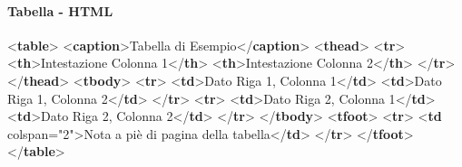 \documentclass[
]{article}
\newenvironment{Shaded}{}{}
\newcommand{\DataTypeTok}[1]{\textcolor[rgb]{0.56,0.13,0.00}{#1}}
\newcommand{\KeywordTok}[1]{\textcolor[rgb]{0.00,0.44,0.13}{\textbf{#1}}}
\newcommand{\NormalTok}[1]{#1}
\newcommand{\OperatorTok}[1]{\textcolor[rgb]{0.40,0.40,0.40}{#1}}
\newcommand{\OtherTok}[1]{\textcolor[rgb]{0.00,0.44,0.13}{#1}}
\newcommand{\StringTok}[1]{\textcolor[rgb]{0.25,0.44,0.63}{#1}}
\begin{document}


\paragraph{Tabella - HTML}\label{tabella---html}

\begin{Shaded}
\begin{Highlighting}[]
\DataTypeTok{\textless{}}\KeywordTok{table}\DataTypeTok{\textgreater{}}
  \DataTypeTok{\textless{}}\KeywordTok{caption}\DataTypeTok{\textgreater{}}\NormalTok{Tabella di Esempio}\DataTypeTok{\textless{}/}\KeywordTok{caption}\DataTypeTok{\textgreater{}}
  \DataTypeTok{\textless{}}\KeywordTok{thead}\DataTypeTok{\textgreater{}}
    \DataTypeTok{\textless{}}\KeywordTok{tr}\DataTypeTok{\textgreater{}}
      \DataTypeTok{\textless{}}\KeywordTok{th}\DataTypeTok{\textgreater{}}\NormalTok{Intestazione Colonna 1}\DataTypeTok{\textless{}/}\KeywordTok{th}\DataTypeTok{\textgreater{}}
      \DataTypeTok{\textless{}}\KeywordTok{th}\DataTypeTok{\textgreater{}}\NormalTok{Intestazione Colonna 2}\DataTypeTok{\textless{}/}\KeywordTok{th}\DataTypeTok{\textgreater{}}
    \DataTypeTok{\textless{}/}\KeywordTok{tr}\DataTypeTok{\textgreater{}}
  \DataTypeTok{\textless{}/}\KeywordTok{thead}\DataTypeTok{\textgreater{}}
  \DataTypeTok{\textless{}}\KeywordTok{tbody}\DataTypeTok{\textgreater{}}
    \DataTypeTok{\textless{}}\KeywordTok{tr}\DataTypeTok{\textgreater{}}
      \DataTypeTok{\textless{}}\KeywordTok{td}\DataTypeTok{\textgreater{}}\NormalTok{Dato Riga 1, Colonna 1}\DataTypeTok{\textless{}/}\KeywordTok{td}\DataTypeTok{\textgreater{}}
      \DataTypeTok{\textless{}}\KeywordTok{td}\DataTypeTok{\textgreater{}}\NormalTok{Dato Riga 1, Colonna 2}\DataTypeTok{\textless{}/}\KeywordTok{td}\DataTypeTok{\textgreater{}}
    \DataTypeTok{\textless{}/}\KeywordTok{tr}\DataTypeTok{\textgreater{}}
    \DataTypeTok{\textless{}}\KeywordTok{tr}\DataTypeTok{\textgreater{}}
      \DataTypeTok{\textless{}}\KeywordTok{td}\DataTypeTok{\textgreater{}}\NormalTok{Dato Riga 2, Colonna 1}\DataTypeTok{\textless{}/}\KeywordTok{td}\DataTypeTok{\textgreater{}}
      \DataTypeTok{\textless{}}\KeywordTok{td}\DataTypeTok{\textgreater{}}\NormalTok{Dato Riga 2, Colonna 2}\DataTypeTok{\textless{}/}\KeywordTok{td}\DataTypeTok{\textgreater{}}
    \DataTypeTok{\textless{}/}\KeywordTok{tr}\DataTypeTok{\textgreater{}}
  \DataTypeTok{\textless{}/}\KeywordTok{tbody}\DataTypeTok{\textgreater{}}
  \DataTypeTok{\textless{}}\KeywordTok{tfoot}\DataTypeTok{\textgreater{}}
    \DataTypeTok{\textless{}}\KeywordTok{tr}\DataTypeTok{\textgreater{}}
      \DataTypeTok{\textless{}}\KeywordTok{td}\OtherTok{ colspan}\OperatorTok{=}\StringTok{"2"}\DataTypeTok{\textgreater{}}\NormalTok{Nota a piè di pagina della tabella}\DataTypeTok{\textless{}/}\KeywordTok{td}\DataTypeTok{\textgreater{}}
    \DataTypeTok{\textless{}/}\KeywordTok{tr}\DataTypeTok{\textgreater{}}
  \DataTypeTok{\textless{}/}\KeywordTok{tfoot}\DataTypeTok{\textgreater{}}
\DataTypeTok{\textless{}/}\KeywordTok{table}\DataTypeTok{\textgreater{}}
\end{Highlighting}
\end{Shaded}
\end{document}
